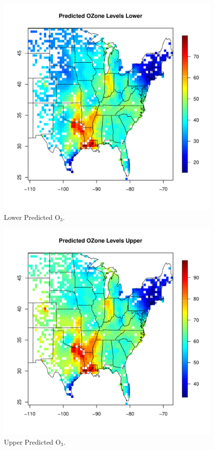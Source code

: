 \documentclass{article}                                                   %
\begin{document}
    \begin{figure}\begin{center}
    \includegraphics{raw/lower.pdf}
      \caption{Lower Predicted O$_3$.}
    \end{center}\end{figure}

    \begin{figure}\begin{center}
    \includegraphics{raw/upper.pdf}
      \caption{Upper Predicted O$_3$.}
    \end{center}\end{figure}
\end{document}
